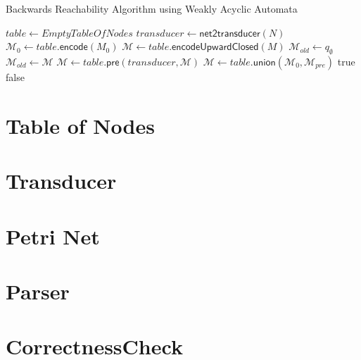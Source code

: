 \begin{algorithm}
\caption{Backwards Reachability Algorithm using Weakly Acyclic Automata}\label{alg:bw_wwa}
\begin{algorithmic}
\State $table \gets EmptyTableOfNodes$
\State $transducer \gets \textsf{net2transducer}(N)$
\State $\mathcal{M}_{0} \gets table.\textsf{encode}(M_{0})$
\State $\mathcal{M} \gets table.\textsf{encodeUpwardClosed}(M)$
\State $\mathcal{M}_{old} \gets q_{\emptyset}$
	\State $\mathcal{M}_{old} \gets \mathcal{M}$
	\State $\mathcal{M} \gets table.\textsf{pre}(transducer,\mathcal{M})$
	\State $\mathcal{M} \gets table.\textsf{union}(\mathcal{M}_{0}, \mathcal{M}_{pre})$
	\Return true
\EndIf
{}
    \Return false
\EndIf
\EndWhile
\end{algorithmic}
\end{algorithm}


\section{Table of Nodes}

\section{Transducer}

\section{Petri Net}

\section{Parser}

\section{CorrectnessCheck}